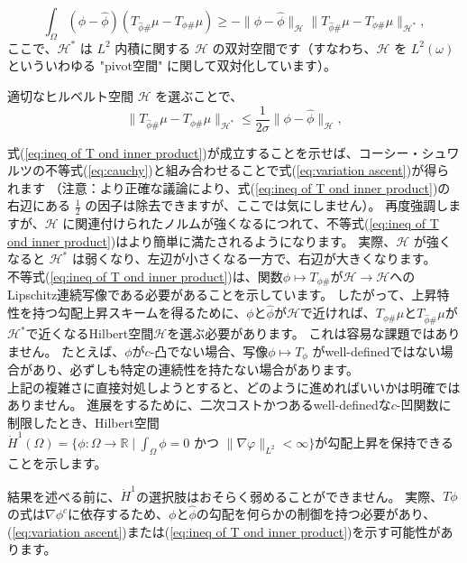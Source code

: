 \documentclass{jsarticle}
\theoremstyle{definition}
\begin{document}
{\begin{equation}
  \label{eq:cauchy}
  \int_\Omega (\phi - \hat{\phi})(T_{\hat{\phi} \#} \mu - T_{\phi \#} \mu) \geq - \|\phi - \hat{\phi}\|_{\mathcal{H}} \|T_{\hat{\phi} \#} \mu - T_{\phi \#} \mu\|_{\mathcal{H}^*},
\end{equation}
ここで、$\mathcal{H}^*$ は $L^2$ 内積に関する $\mathcal{H}$  の双対空間です（すなわち、$\mathcal{H}$  を $L^2(\omega)$ といういわゆる "pivot空間" に関して双対化しています）。


適切なヒルベルト空間 $\mathcal{H}$ を選ぶことで、
\begin{equation}
  \label{eq:ineq of T ond inner product}
  \|T_{\hat{\phi} \#} \mu - T_{\phi \#} \mu\|_{\mathcal{H}^*} \leq \frac{1}{2 \sigma} \|\phi - \hat{\phi}\|_\mathcal{H} ,
\end{equation}

式(\ref{eq:ineq of T ond inner product})が成立することを示せば、コーシー・シュワルツの不等式(\ref{eq:cauchy})と組み合わせることで式(\ref{eq:variation ascent})が得られます
（注意：より正確な議論により、式(\ref{eq:ineq of T ond inner product})の右辺にある $\frac{1}{2}$ の因子は除去できますが、ここでは気にしません）。
再度強調しますが、$\mathcal{H}$ に関連付けられたノルムが強くなるにつれて、不等式(\ref{eq:ineq of T ond inner product})はより簡単に満たされるようになります。
実際、$\mathcal{H}$ が強くなると $\mathcal{H}^*$ は弱くなり、左辺が小さくなる一方で、右辺が大きくなります。\\
{\color{teal}
不等式(\ref{eq:ineq of T ond inner product})は、関数$\phi \mapsto T_{\phi \#}$が$\mathcal{H} \to \mathcal{H}$へのLipschitz連続写像である必要があることを示しています。
}
したがって、上昇特性を持つ勾配上昇スキームを得るために、$\phi$と$\hat{\phi}$が$\mathcal{H}$で近ければ、$T_{\phi \#} \mu$と$T_{\hat{\phi} \#} \mu$が$\mathcal{H}^*$で近くなるHilbert空間$\mathcal{H}$を選ぶ必要があります。
これは容易な課題ではありません。
たとえば、$\phi$が$c$-凸でない場合、写像$\phi \mapsto T_\phi$ がwell-definedではない場合があり、必ずしも特定の連続性を持たない場合があります。\\


上記の複雑さに直接対処しようとすると、どのように進めればいいかは明確ではありません。
進展をするために、二次コストかつあるwell-definedな$c$-凹関数に制限したとき、Hilbert空間$\dot{H}^1(\Omega)=\{\phi:\Omega\to\mathbb{R} \mid \int_\Omega \phi = 0 \text{ かつ } \|\nabla \varphi\|_{L^2}<\infty\}$が勾配上昇を保持できることを示します。


結果を述べる前に、$\dot{H}^1$の選択肢はおそらく弱めることができません。
実際、$T\phi$の式は$\nabla\phi^c$に依存するため、$\phi$と$\hat{\phi}$の勾配を何らかの制御を持つ必要があり、
(\ref{eq:variation ascent})または(\ref{eq:ineq of T ond inner product})を示す可能性があります。\\
}
\end{document}
